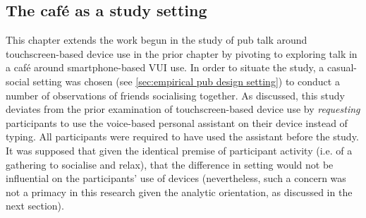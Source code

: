 


\subsection{The caf\'{e} as a study setting}\label{sec:empirical cafe design setting}
\begin{revisedsubmission}
This chapter extends the work begun in the study of pub talk around touchscreen-based device use in the prior chapter by pivoting to exploring talk in a caf\'{e} around smartphone-based \ac{VUI} use.
In order to situate the study, a casual-social setting was chosen (see \ref{sec:empirical pub design setting}) to conduct a number of observations of friends socialising together.
As discussed, this study deviates from the prior examination of touchscreen-based device use by \textit{requesting} participants to use the voice-based personal assistant on their device instead of typing.
All participants were required to have used the assistant before the study.
It was supposed that given the identical premise of participant activity (i.e. of a gathering to socialise and relax), that the difference in setting would not be influential on the participants' use of devices (nevertheless, such a concern was not a primacy in this research given the analytic orientation, as discussed in the next section).


\end{revisedsubmission}
